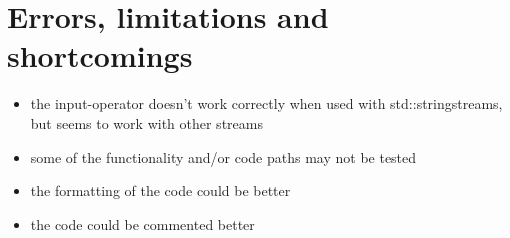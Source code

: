 \documentclass[11pt]{article}
\begin{document}
\section{Errors, limitations and shortcomings}


\begin{itemize}
\item{the input-operator doesn't work correctly when used with
  std::stringstreams, but seems to work with other streams}
\item{some of the functionality and/or code paths may not be tested}
\item{the formatting of the code could be better}
\item{the code could be commented better}
\end{itemize}
\end{document}
